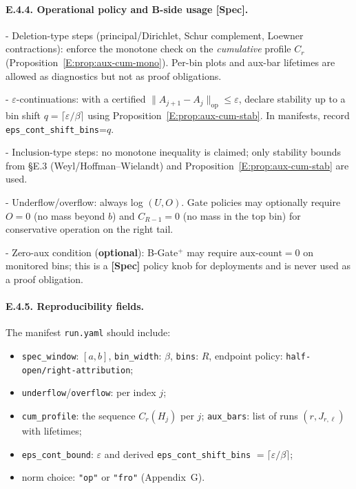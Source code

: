 \documentclass[11pt]{article}
\DeclareRobustCommand{\hyp}{\nobreakdash-}
\numberwithin{equation}{section}
\theoremstyle{definition}
\begin{document}
\paragraph{E.4.4. Operational policy and B-side usage \texorpdfstring{[Spec]}{[Spec]}.}
- Deletion-type steps (principal/Dirichlet, Schur complement, Loewner contractions): enforce the monotone check on the \emph{cumulative} profile \(C_r\) (Proposition~\ref{E:prop:aux-cum-mono}). Per-bin plots and aux-bar lifetimes are allowed as diagnostics but not as proof obligations.

- \(\varepsilon\)-continuations: with a certified \(\|A_{j+1}-A_j\|_{\mathrm{op}}\le \varepsilon\), declare stability up to a bin shift \(q=\lceil \varepsilon/\beta\rceil\) using Proposition~\ref{E:prop:aux-cum-stab}. In manifests, record \texttt{eps\_cont\_shift\_bins}=\(q\).

- Inclusion-type steps: no monotone inequality is claimed; only stability bounds from §E.3 (Weyl/Hoffman–Wielandt) and Proposition~\ref{E:prop:aux-cum-stab} are used.

- Underflow/overflow: always log \((U,O)\). Gate policies may optionally require \(O=0\) (no mass beyond \(b\)) and \(C_{R-1}=0\) (no mass in the top bin) for conservative operation on the right tail.

- Zero-aux condition (\textbf{optional}): B\hyp Gate\(^{+}\) may require \(\mathrm{aux\text{-}count}=0\) on monitored bins; this is a \textbf{[Spec]} policy knob for deployments and is never used as a proof obligation.

\paragraph{E.4.5. Reproducibility fields.}
The manifest \texttt{run.yaml} should include:
\begin{itemize}
  \item \texttt{spec\_window}: \([a,b]\), \texttt{bin\_width}: \(\beta\), \texttt{bins}: \(R\), endpoint policy: \texttt{half-open/right-attribution};
  \item \texttt{underflow}/\texttt{overflow}: per index \(j\);
  \item \texttt{cum\_profile}: the sequence \(C_r(H_j)\) per \(j\); \texttt{aux\_bars}: list of runs \((r,J_{r,\ell})\) with lifetimes;
  \item \texttt{eps\_cont\_bound}: \(\varepsilon\) and derived \texttt{eps\_cont\_shift\_bins} \(= \lceil \varepsilon/\beta\rceil\);
  \item norm choice: \texttt{"op"} or \texttt{"fro"} (Appendix~G).
\end{itemize}
\end{document}
